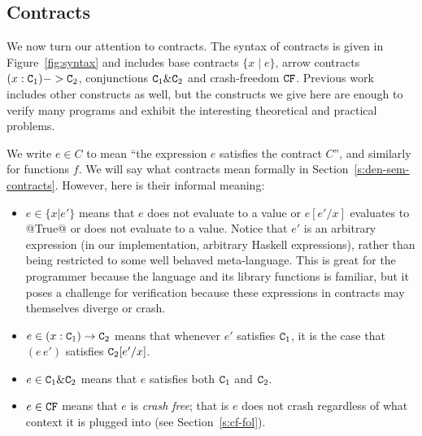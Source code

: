 \subsection{Contracts}


We now turn our attention to contracts. The syntax of contracts
is given in Figure~\ref{fig:syntax} and includes base contracts
$\{ x \mid e \}$, arrow contracts $(x : {\tt C}_1) -> {\tt C}_2$, conjunctions
${\tt C}_1 \& {\tt C}_2$ and crash-freedom ${\tt CF}$. Previous work~\cite{xu+:contracts}
includes other constructs as well, but the constructs we give here are enough to verify
many programs and exhibit the interesting theoretical and practical problems.

We write $e \in C$ to mean ``the expression $e$ satisfies the contract $C$'', and similarly
for functions $f$.  We will say what contracts mean formally in
Section~\ref{s:den-sem-contracts}.  However, here is their informal meaning:
\begin{itemize}
\item $e \in \{x | e'\}$ means that $e$ does not evaluate to a value
  or $e[e'/x]$ evaluates to @True@ or does not evaluate to a value.
Notice that $e'$ is an arbitrary expression
(in our implementation, arbitrary Haskell expressions),
rather than being restricted to some well behaved meta-language.  This
is great for the programmer because the language and its library
functions is familiar, but it poses a challenge for verification
because these expressions in contracts may themselves diverge or
crash.
\item $e \in (x:{\tt C}_1) \rightarrow {\tt C}_2$ means that whenever $e'$ satisfies ${\tt C}_1$, it
is the case that $(e\,e')$ satisfies ${\tt C}_2[e'/x]$.
\item $e \in {\tt C}_1 \& {\tt C}_2$ means that $e$ satisfies both ${\tt C}_1$ and ${\tt C}_2$.
\item $e \in {\tt CF}$ means that $e$ is \emph{crash free}; that is $e$ does not
crash regardless of what context it is plugged into (see Section~\ref{s:cf-fol}).
\end{itemize}

